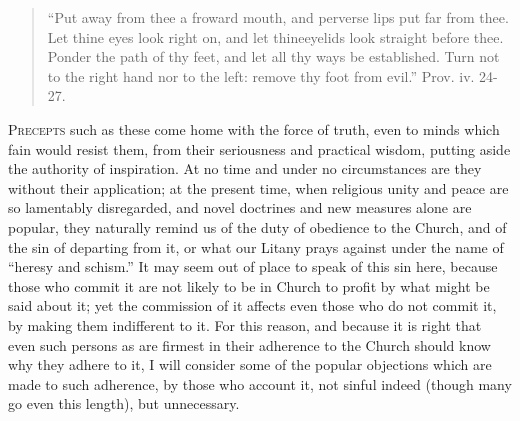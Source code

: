 \begin{quote}

``Put away from thee a froward mouth, and perverse lips put
far from thee. Let thine eyes look right on, and let thine\emph{}eyelids
look straight before thee. Ponder the path of thy feet, and let all
thy ways be established. Turn not to the right hand nor to the left:
remove thy foot from evil.'' Prov. iv. 24-27.

\end{quote}

P\textsc{recepts} such as these come home with the force of truth, even to
minds which fain would resist them, from their seriousness and
practical wisdom, putting aside the authority of inspiration. At no
time and under no circumstances are they without their application; at
the present time, when religious unity and peace are so lamentably
disregarded, and novel doctrines and new measures alone are popular,
they naturally remind us of the duty of obedience to the Church, and
of the sin of departing from it, or what our Litany prays against
under the name of ``heresy and schism.'' It may seem out of
place to speak of this sin here, because those who commit it are not
likely to be in Church to profit by what might be said about it; yet
the commission of it affects even those who do not commit it, by
making them indifferent to it. For this reason, and because it is
right that even such persons as are firmest in their adherence to the
Church should know why they adhere to it, I will consider some of the
popular objections which are made to such adherence, by those who
account it, not sinful indeed (though many go even this length), but
unnecessary.

